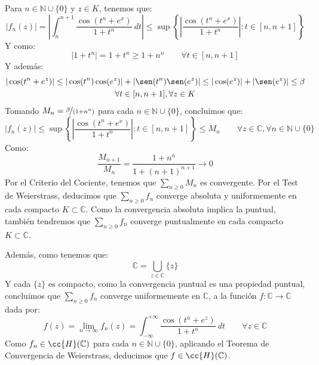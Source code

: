 \documentclass[12pt]{article}
\begin{document}
\begin{ejercicio}[2.5 puntos]
\begin{enumerate}[label=\alph*)]
                Para $n\in \mathbb{N}\cup \{0\}$ y $z\in K$, tenemos que:
                \begin{equation*}
                    |f_n(z)| = \left|\int_{n}^{n+1} \dfrac{\cos(t^n+e^x)}{1+t^n}~dt \right| \leq \sup\left\{\left|\dfrac{\cos(t^n+e^x)}{1+t^n}\right| : t\in [n,n+1]\right\}
                \end{equation*}
                Y como:
                \begin{equation*}
                    |1+t^n| = 1+t^n \geq 1+n^n \qquad \forall t\in [n,n+1]
                \end{equation*}
                Y además:
                \begin{multline*}
                    |\cos(t^n+e^z)| \leq |\cos(t^n)\cos(e^z)| + |\sen(t^n)\sen(e^z)| \leq |\cos(e^z)| + |\sen(e^z)|\leq \beta \\ \forall t\in [n,n+1], \forall z\in K
                \end{multline*}
                Tomando $M_n = \nicefrac{\beta}{(1+n^n)}$ para cada $n\in \mathbb{N}\cup \{0\}$, concluimos que:
                \begin{equation*}
                    |f_n(z)| \leq \sup\left\{\left|\dfrac{\cos(t^n+e^x)}{1+t^n}\right| : t\in [n,n+1]\right\} \leq M_n \qquad \forall z\in \mathbb{C}, \forall n\in \mathbb{N}\cup \{0\}
                \end{equation*}
                Como:
                \begin{equation*}
                    \dfrac{M_{n+1}}{M_n} = \dfrac{1+n^n}{1+{(n+1)}^{n+1}} \to 0
                \end{equation*}
                Por el Criterio del Cociente, tenemos que $\sum\limits_{n\geq 0}M_n$ es convergente. Por el Test de Weierstrass, deducimos que $\sum\limits_{n\geq 0}f_n$ converge absoluta y uniformemente en cada compacto $K\subset \mathbb{C}$. Como la convergencia absoluta implica la puntual, también tendremos que $\sum\limits_{n\geq 0}f_n$ converge puntualmente en cada compacto $K\subset \mathbb{C}$.

                Además, como tenemos que:
                \begin{equation*}
                    \mathbb{C} = \bigcup_{z\in \mathbb{C}} \{z\}
                \end{equation*}
                Y cada $\{z\}$ es compacto, como la convergencia puntual es una propiedad puntual, concluimos que $\sum\limits_{n\geq 0}f_n$ converge uniformemente en $\mathbb{C}$, a la función $f:\mathbb{C}\to \mathbb{C}$ dada por:
                \begin{equation*}
                    f(z) = \lim_{n\to\infty} f_n(z) = \int_{-\infty}^{+\infty} \dfrac{\cos(t^n+e^z)}{1+t^n}~dt  \qquad \forall z\in \mathbb{C}
                \end{equation*} 
                Como $f_n\in \cc{H}(\mathbb{C})$ para cada $n\in \mathbb{N}\cup\{0\}$, aplicando el Teorema de Convergencia de Weierstrass, deducimos que $f\in \cc{H}(\mathbb{C})$.
        \end{enumerate}
    \end{ejercicio}
\end{document}
